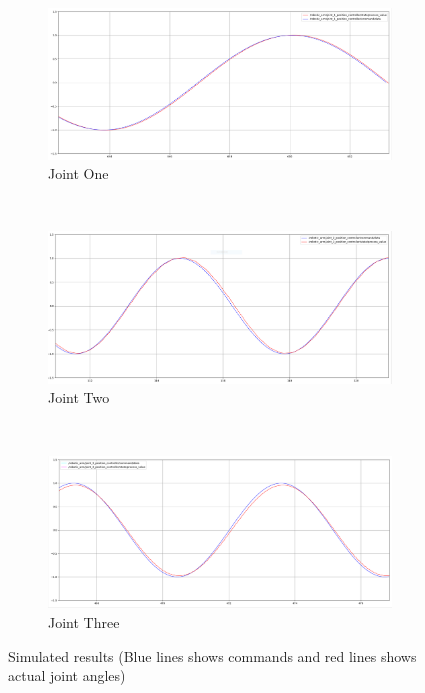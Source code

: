 \documentclass{article}
\begin{document}
\begin{figure}[ht]
    \centering
    \begin{subfigure}{0.8\linewidth}
        \includegraphics[width=\linewidth]{figures/result-joint-1.PNG}
        \caption{Joint One}
    \end{subfigure}
    \\
    \begin{subfigure}{0.8\linewidth}
        \includegraphics[width=\linewidth]{figures/result-joint-2.PNG}
        \caption{Joint Two}
    \end{subfigure}
    \\
    \begin{subfigure}{0.8\linewidth}
        \includegraphics[width=\linewidth]{figures/result-joint-3.PNG}
        \caption{Joint Three}
    \end{subfigure}
    \caption[Simulated results]{Simulated results (Blue lines shows commands and red lines shows actual joint angles)}
    \label{fig:simulated-result}
\end{figure}
\end{document}
